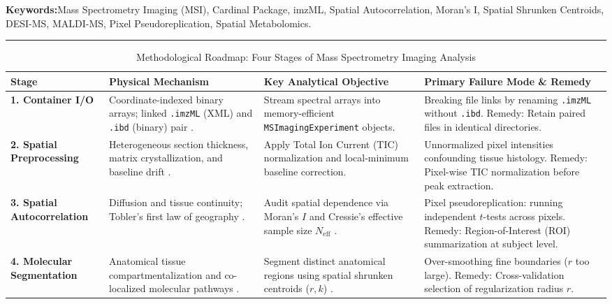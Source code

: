 \documentclass[11pt,twoside,openright]{book}
\begin{document}
\noindent
\textbf{Keywords:}\enspace Mass Spectrometry Imaging (MSI), Cardinal Package, imzML, Spatial Autocorrelation, Moran's I, Spatial Shrunken Centroids, DESI-MS, MALDI-MS, Pixel Pseudoreplication, Spatial Metabolomics.

\vspace{0.8em}
\noindent\rule{\textwidth}{0.4pt}


\begin{table}[ht]
\centering
\caption{Methodological Roadmap: Four Stages of Mass Spectrometry Imaging Analysis}
\label{tab:msi_roadmap}
\small
\begin{tabularx}{\textwidth}{l p{3.8cm} p{4.2cm} X}
\toprule
\textbf{Stage} & \textbf{Physical Mechanism} & \textbf{Key Analytical Objective} & \textbf{Primary Failure Mode \& Remedy} \\
\midrule
\textbf{1. Container I/O} & Coordinate-indexed binary arrays; linked \texttt{.imzML} (XML) and \texttt{.ibd} (binary) pair \cite{schramm2012imputing, bemis2015cardinal, huber2015orchestrating}. & Stream spectral arrays into memory-efficient \texttt{MSImagingExperiment} objects. & Breaking file links by renaming \texttt{.imzML} without \texttt{.ibd}. Remedy: Retain paired files in identical directories. \\
\addlinespace
\textbf{2. Spatial Preprocessing} & Heterogeneous section thickness, matrix crystallization, and baseline drift \cite{deininger2011matrix, palmer2017fdr}. & Apply Total Ion Current (TIC) normalization and local-minimum baseline correction. & Unnormalized pixel intensities confounding tissue histology. Remedy: Pixel-wise TIC normalization before peak extraction. \\
\addlinespace
\textbf{3. Spatial Autocorrelation} & Diffusion and tissue continuity; Tobler's first law of geography \cite{tobler1970computer, moran1950notes}. & Audit spatial dependence via Moran's $I$ and Cressie's effective sample size $N_{\text{eff}}$ \cite{cressie1993statistics}. & Pixel pseudoreplication: running independent $t$-tests across pixels. Remedy: Region-of-Interest (ROI) summarization at subject level. \\
\addlinespace
\textbf{4. Molecular Segmentation} & Anatomical tissue compartmentalization and co-localized molecular pathways \cite{tibshirani2002diagnosis, bemis2015cardinal}. & Segment distinct anatomical regions using spatial shrunken centroids ($r, k$) \cite{bemis2023cardinal}. & Over-smoothing fine boundaries ($r$ too large). Remedy: Cross-validation selection of regularization radius $r$. \\
\bottomrule
\end{tabularx}
\end{table}
\end{document}
